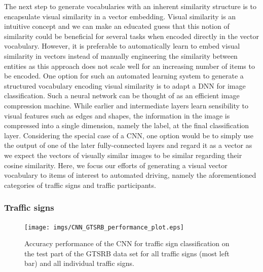 The next step to generate vocabularies with an inherent similarity structure is to encapsulate visual similarity in a vector embedding.
Visual similarity is an intuitive concept and we can make an educated guess that this notion of similarity could be beneficial for several tasks when encoded directly in the vector vocabulary. 
However, it is preferable to automatically learn to embed visual similarity in vectors instead of manually engineering the similarity between entities as this approach does not scale well for an increasing number of items to be encoded.
One option for such an automated learning system to generate a structured vocabulary encoding visual similarity is to adapt a \acf{DNN} for image classification.
Such a neural network can be thought of as an efficient image compression machine.
While earlier and intermediate layers learn sensibility to visual features such as edges and shapes, the information in the image is compressed into a single dimension, namely the label, at the final classification layer.
Considering the special case of a \acf{CNN}, one option would be to simply use the output of one of the later fully-connected layers and regard it as a vector as we expect the vectors of visually similar images to be similar regarding their cosine similarity.
Here, we focus our efforts of generating a visual vector vocabulary to items of interest to automated driving, namely the aforementioned categories of traffic signs and traffic participants.

\subsubsection{Traffic signs}%
\label{ssubsec:traffic_signs}

\begin{figure}[t]
    \centering
    \texttt{[image: imgs/CNN\_GTSRB\_performance\_plot.eps]}
    \caption{Accuracy performance of the \ac{CNN} for traffic sign classification on the test part of the \ac{GTSRB} data set for all traffic signs (most left bar) and all individual traffic signs.}
    \label{fig:CNN_GTSRB_performance_plot}
\end{figure}

